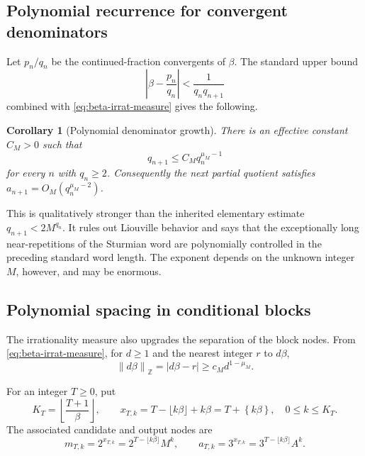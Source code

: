 \documentclass[11pt,oneside]{article}
\newtheorem{corollary}[theorem]{Corollary}
\theoremstyle{definition}
\theoremstyle{remark}
\newcommand{\Z}{\mathbb Z}
\newcommand{\fract}[1]{\left\{#1\right\}}
\newcommand{\distZ}[1]{\left\lVert #1\right\rVert_{\Z}}
\begin{document}
\subsection{Polynomial recurrence for convergent denominators}

Let $p_n/q_n$ be the continued-fraction convergents of $\beta$.  The standard upper bound
\[
  \left|\beta-\frac{p_n}{q_n}\right|<\frac1{q_nq_{n+1}}
\]
combined with \eqref{eq:beta-irrat-measure} gives the following.

\begin{corollary}[Polynomial denominator growth]\label{cor:q-growth}
There is an effective constant $C_M>0$ such that
\begin{equation}\label{eq:q-growth}
  q_{n+1}\le C_M q_n^{\mu_M-1}
\end{equation}
for every $n$ with $q_n\ge2$.  Consequently the next partial quotient satisfies
$a_{n+1}=O_M(q_n^{\mu_M-2})$.
\end{corollary}

This is qualitatively stronger than the inherited elementary estimate
$q_{n+1}<2M^{q_n}$.  It rules out Liouville behavior and says that the exceptionally long
near-repetitions of the Sturmian word are polynomially controlled in the preceding standard
word length.  The exponent depends on the unknown integer $M$, however, and may be enormous.

\subsection{Polynomial spacing in conditional blocks}

The irrationality measure also upgrades the separation of the block nodes.  From
\eqref{eq:beta-irrat-measure}, for $d\ge1$ and the nearest integer $r$ to $d\beta$,
\begin{equation}\label{eq:beta-mod-one}
  \distZ{d\beta}=|d\beta-r|
  \ge c_M d^{1-\mu_M}.
\end{equation}

For an integer $T\ge0$, put
\[
  K_T=\left\lfloor\frac{T+1}{\beta}\right\rfloor,
  \qquad
  x_{T,k}=T-\lfloor k\beta\rfloor+k\beta
         =T+\fract{k\beta},
  \quad 0\le k\le K_T.
\]
The associated candidate and output nodes are
\begin{equation}\label{eq:block-pairs}
  m_{T,k}=2^{x_{T,k}}=2^{T-\lfloor k\beta\rfloor}M^k,
  \qquad
  a_{T,k}=3^{x_{T,k}}=3^{T-\lfloor k\beta\rfloor}A^k.
\end{equation}
\end{document}
